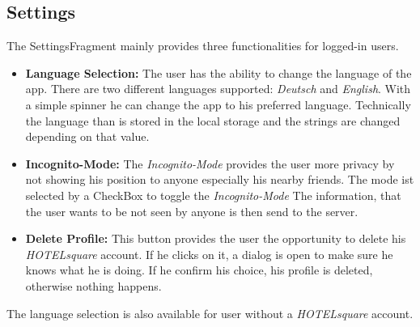 \subsection{Settings}
The SettingsFragment mainly provides three functionalities for logged-in users.

\begin{itemize}
\item \textbf{Language Selection:} The user has the ability to change the language of the app. There are two different languages supported: \textit{Deutsch} and \textit{English}. With a simple spinner he can change the app to his preferred language. Technically the language than is stored in the local storage and the strings are changed depending on that value. 
\item \textbf{Incognito-Mode:} The \textit{Incognito-Mode} provides the user more privacy by not showing his position to anyone especially his nearby friends. The mode ist selected by a CheckBox to toggle the \textit{Incognito-Mode} The information, that the user wants to be not seen by anyone is then send to the server.
\item \textbf{Delete Profile:} This button provides the user the opportunity to delete his \textit{HOTELsquare} account. If he clicks on it, a dialog is open to make sure he knows what he is doing. If he confirm his choice, his profile is deleted, otherwise nothing happens. 
\end{itemize}

The language selection is also available for user without a \textit{HOTELsquare} account.


